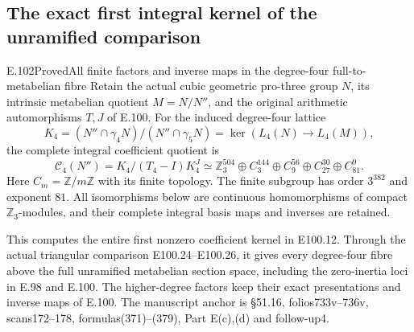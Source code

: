 \subsection{The exact first integral kernel of the unramified comparison}

\begin{statement}{E.102}{Proved}{All finite factors and inverse maps in the degree-four full-to-metabelian fibre}
Retain the actual cubic geometric pro-three group $N$,
its intrinsic metabelian quotient $M=N/N''$, and the
original arithmetic automorphisms $T,J$ of E.100.
For the induced degree-four lattice
\[
 K_4=(N''\cap\gamma_4N)/(N''\cap\gamma_5N)
       =\ker(L_4(N)\longrightarrow L_4(M)),
 \tag{E102.1}
\]
the complete integral coefficient quotient is
\[
 \mathcal C_4(N'')=K_4/(T_4-I)K_4^J
   \simeq\mathbb Z_3^{504}\oplus C_3^{144}
       \oplus C_9^{56}\oplus C_{27}^{30}\oplus C_{81}^{9}.
 \tag{E102.2}
\]
Here $C_m=\mathbb Z/m\mathbb Z$ with its finite topology.
The finite subgroup has order $3^{382}$ and exponent $81$.
All isomorphisms below are continuous homomorphisms of
compact $\mathbb Z_3$-modules, and their complete integral
basis maps and inverses are retained.

This computes the entire first nonzero coefficient kernel
in E100.12. Through the actual triangular comparison
E100.24--E100.26, it gives every degree-four fibre above
the full unramified metabelian section space, including
the zero-inertia loci in E.98 and E.100.
The higher-degree factors keep their exact presentations
and inverse maps of E.100. The manuscript anchor is
\S51.16, folios733v--736v, scans172--178,
formulas(371)--(379), Part E(c),(d) and follow-up4.
\end{statement}

